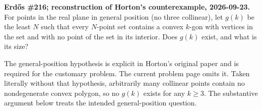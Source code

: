 \textbf{Erd\H{o}s \#216; reconstruction of Horton's counterexample, 2026-09-23.}
For points in the real plane in general position (no three collinear), let $g(k)$ be the least $N$ such that every $N$-point set contains a convex $k$-gon with vertices in the set and with no point of the set in its interior. Does $g(k)$ exist, and what is its size?

The general-position hypothesis is explicit in Horton's original paper and is required for the customary problem. The current problem page omits it. Taken literally without that hypothesis, arbitrarily many collinear points contain no nondegenerate convex polygon, so no $g(k)$ exists for any $k\geq3$. The substantive argument below treats the intended general-position question.
